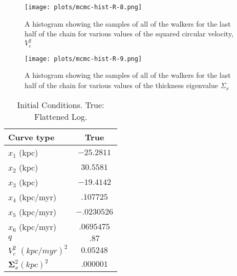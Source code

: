 \documentclass[12pt,preprint]{aastex}
\begin{document}
\clearpage
\begin{figure}
\centering
\texttt{[image: plots/mcmc-hist-R-8.png]}
\caption{A histogram showing the samples of all of the walkers for the last half of the chain for various 
values of the squared circular velocity, $V_c^2$}
\label{fig:mcmchistVc}
\end{figure}

\clearpage
\begin{figure}
\centering
\texttt{[image: plots/mcmc-hist-R-9.png]}
\caption{A histogram showing the samples of all of the walkers for the last half of the chain for various 
values of the thickness eigenvalue $\Sigma_x$}
\label{fig:mcmchistSigmax}
\end{figure}


\clearpage
\begin{table}
\centering
\caption{Initial Conditions. True: Flattened Log.} 
\begin{tabular}{| l | c | }
\hline
Curve type & True  \\
\hline
$x_1$ (kpc) & $-25.2811$  \\ \hline
$x_2$ (kpc) & $30.5581$ \\ \hline
$x_3$ (kpc) & $-19.4142$ \\ \hline
$x_4$ (kpc/myr) & $ .107725$ \\ \hline
$x_5$ (kpc/myr) & $-.0230526 $ \\ \hline
$x_6$ (kpc/myr) & $.0695475$ \\ \hline
$q$ & $.87$ \\ \hline
$V_c^2$ $(kpc/myr)^2$ & $0.05248$ \\ \hline
$\mathbf{\Sigma}_x^2 (kpc)^2$ & $.000001 $ \\
\hline
\end{tabular}
\end{table}
\end{document}
